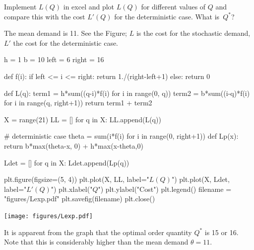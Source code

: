 \begin{exercise}[Continuation]\label{ex:55}
Implement $L(Q)$ in excel and plot $L(Q)$ for different values of $Q$ and compare this with the cost $L'(Q)$ for the deterministic case. What is~$Q^*$?
\begin{solution}
The mean demand is 11. See the Figure; $L$ is the cost for the stochastic demand, $L'$ the cost for the deterministic case.

  

\begin{pycode}[news]
h = 1
b = 10
left = 6
right = 16

def f(i):
    if left <= i <= right:
        return 1./(right-left+1)
    else:
        return 0

def L(q):
    term1 = h*sum((q-i)*f(i) for i in range(0, q))
    term2 = b*sum((i-q)*f(i) for i in range(q, right+1))
    return term1 + term2

X = range(21)
LL = []
for q in X:
    LL.append(L(q))

# deterministic case
theta = sum(i*f(i) for i in range(0, right+1))
def Lp(x):
    return b*max(theta-x, 0) + h*max(x-theta,0)

Ldet = []
for q in X:
    Ldet.append(Lp(q))

plt.figure(figsize=(5, 4))
plt.plot(X, LL, label="$L(Q)$")
plt.plot(X, Ldet, label="$L'(Q)$")
plt.xlabel("$Q$")
plt.ylabel("Cost")
plt.legend()
filename = "figures/Lexp.pdf"
plt.savefig(filename)
plt.close()
\end{pycode}

\begin{center}
\texttt{[image: figures/Lexp.pdf]}
\end{center}


It is apparent from the graph that the optimal order quantity $Q^*$ is 15 or 16. Note that this is considerably higher than the mean demand $\theta = 11$. 
\end{solution}
\end{exercise}
 


